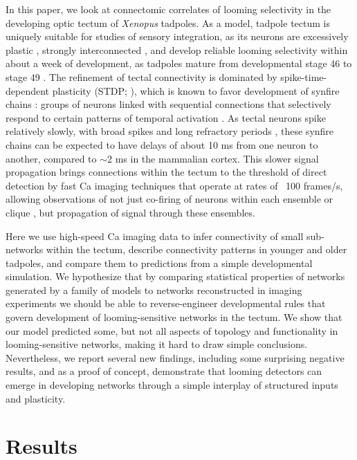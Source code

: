 \documentclass{article}
\begin{document}
In this paper, we look at connectomic correlates of looming selectivity in the developing optic tectum of \textit{Xenopus} tadpoles. As a model, tadpole tectum is uniquely suitable for studies of sensory integration, as its neurons are excessively plastic \citep{pratt2007intrinsic,busch2019}, strongly interconnected \citep{james2015}, and develop reliable looming selectivity within about a week of development, as tadpoles mature from developmental stage 46 to stage 49 \citep{dong2009,khakhalin2014}. The refinement of tectal connectivity is dominated by spike-time-dependent plasticity (STDP; \citealt{zhang1998stdp,mu2006stdp}), which is known to favor development of synfire chains \citep{fiete2010chains,zheng2014synfire}: groups of neurons linked with sequential connections that selectively respond to certain patterns of temporal activation \citep{clopath2010stdpcoding}. As  tectal neurons spike relatively slowly, with broad spikes and long refractory periods \citep{ciarleglio2015,jang2016,busch2019}, these synfire chains can be expected to have delays of about 10 ms from one neuron to another, compared to $\sim$2 ms in the mammalian cortex. This slower signal propagation brings connections within the tectum to the threshold of direct detection by fast Ca imaging techniques that operate at rates of ~100 frames/s, allowing observations of not just co-firing of neurons within each ensemble or clique \citep{reimann2017,avitan2017spontaneous}, but propagation of signal through these ensembles.

Here we use high-speed Ca imaging data to infer connectivity of small sub-networks within the tectum, describe connectivity patterns in younger and older tadpoles, and compare them to predictions from a simple developmental simulation. We hypothesize that by comparing statistical properties of networks generated by a family of models to networks reconstructed in imaging experiments we should be able to reverse-engineer developmental rules that govern development of looming-sensitive networks in the tectum. We show that our model predicted some, but not all aspects of topology and functionality in looming-sensitive networks, making it hard to draw simple conclusions. Nevertheless, we report several new findings, including some surprising negative results, and as a proof of concept, demonstrate that looming detectors can emerge in developing networks through a simple interplay of structured inputs and plasticity.

\section*{Results}
\end{document}
